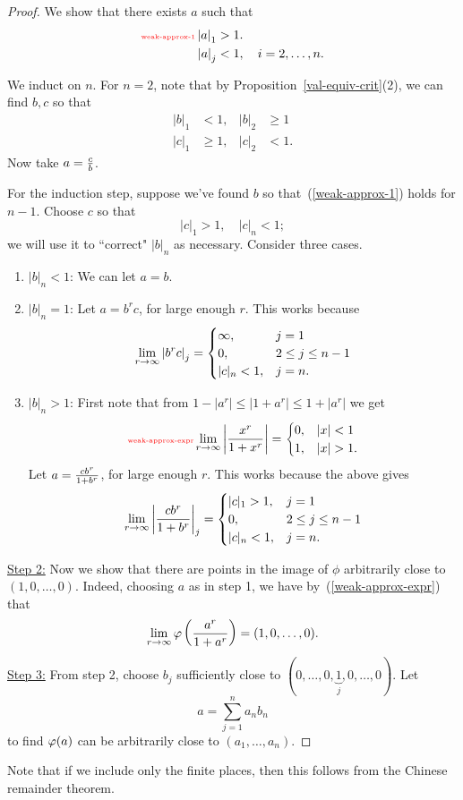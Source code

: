 \begin{proof}
 We show that there exists $a$ such that 
\begin{align}\llabel{weak-approx-1}
\ab{a}_{1}&>1.\\
\nonumber\ab{a}_{j}&<1,\quad i=2,\ldots, n.
\end{align}

We induct on $n$. For $n=2$, note that by 
Proposition~\ref{val-equiv-crit}(2), we can find $b,c$ so that
\begin{align*}
|b|_{1}&< 1,&|b|_{2}&\ge1\\
|c|_{1}&\ge1,&|c|_{2}&<1.
\end{align*}
Now take $a=\frac{c}{b}$.

For the induction step, suppose we've found $b$ so that~(\ref{weak-approx-1}) holds for $n-1$. Choose $c$ so that 
\[
|c|_1>1,\quad |c|_n<1;
\]
we will use it to ``correct" $|b|_n$ as necessary. Consider three cases.
\begin{enumerate}
\item $|b|_n<1$: We can let $a=b$.
\item $|b|_n=1$: Let $a=b^r c$, for large enough $r$.
This works because
\[
\lim_{r\to \infty}\left| {b^rc} \right|_j=\begin{cases}
\infty, &j=1\\
0, &2\le j\le n-1\\
|c|_n<1, &j=n.
\end{cases}
\]
\item $|b|_n>1$: First note that from $1-|a^r|\le|1+a^r|\le1+|a^r|$ we get
\begin{equation}\llabel{weak-approx-expr}
\lim_{r\to \iy}\ab{\fc{x^r}{1+x^r}}=\begin{cases}
0, &|x|<1\\
1,&|x|>1.
\end{cases}
\end{equation}
Let $a=\frac{cb^r}{1+b^r}$, for large enough $r$. This works because the above gives
\[
\lim_{r\to \infty}\left| {\frac{cb^r}{1+b^r}} \right|_j=\begin{cases}
|c|_1>1, &j=1\\
0, &2\le j\le n-1\\
|c|_n<1, &j=n.
\end{cases}
\]
\end{enumerate}
\noindent\underline{Step 2:} Now we show that there are points in the image of $\phi$ arbitrarily close to $(1,0,\ldots,0)$. Indeed, choosing $a$ as in step 1, we have by~(\ref{weak-approx-expr}) that
\[
\lim_{r\to \infty}\varphi\left( {\frac{a^r}{1+a^r}} \right)=(1,0,\ldots, 0).
\]
\noindent\underline{Step 3:} From step 2, choose $b_j$ sufficiently close to $(0,\ldots, 0, \underbrace{1}_j,0,\ldots, 0)$. Let
\[
a=\sum_{j=1}^n a_nb_n
\]
to find $\varphi(a)$ can be arbitrarily close to $(a_1,\ldots, a_n)$.
\end{proof}
Note that if we include only the finite places, then this follows from the %
Chinese remainder theorem.
